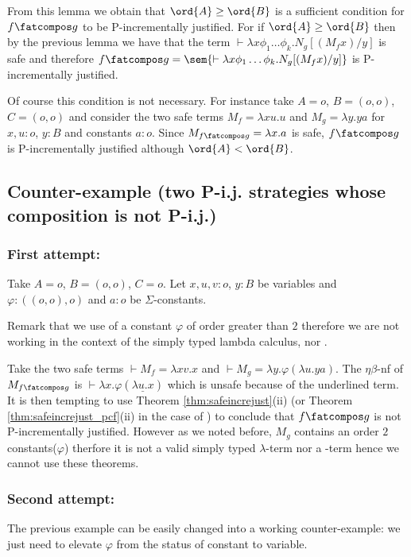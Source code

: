 From this lemma we obtain that $\ord{A}\geq\ord{B}$ is
a sufficient condition for $f\fatcompos g$ to be P-incrementally justified.
For if $\ord{A}\geq\ord{B}$ then by the previous lemma we have that the term $\vdash \lambda x \phi_1 \dots \phi_k. N_g [(M_f x) / y]$
is safe and therefore $f\fatcompos g = \sem{\vdash \lambda x \phi_1 \dots \phi_k. N_g [(M_f x) / y]}$ is P-incrementally justified.


Of course this condition is not necessary. For instance take $A=o$, $B=(o,o)$, $C=(o,o)$ and consider the two safe terms $M_f = \lambda x u.u$ and $M_g = \lambda y . y a$ for $x,u:o$, $y:B$ and constants $a:o$. Since $M_{f\fatcompos g} = \lambda x . a$ is safe, $f\fatcompos g$ is P-incrementally justified although $\ord{A} < \ord{B}$.





\subsection{Counter-example (two P-i.j. strategies whose composition is not P-i.j.)}
\subsubsection{First attempt:}

Take $A=o$, $B=(o,o)$, $C=o$. Let $x,u,v:o$, $y:B$ be variables and $\varphi:((o,o),o)$ and $a:o$ be $\Sigma$-constants.

Remark that we use of a constant $\varphi$ of order greater than $2$ therefore we are not working in the context of the simply typed lambda calculus, nor \pcf.

Take the two safe terms $\vdash  M_f = \lambda xv.x$ and $\vdash M_g = \lambda y . \varphi (\lambda u . y a)$.
The $\eta\beta$-nf of $M_{f\fatcompos g}$ is $\vdash \lambda x . \varphi (\underline{\lambda u . x})$ which is unsafe because of the underlined term. It is then tempting to use
Theorem \ref{thm:safeincrejust}(ii) (or Theorem \ref{thm:safeincrejust_pcf}(ii) in the case of \pcf) to conclude that
$f\fatcompos g$ is not P-incrementally justified. However as we noted before, $M_g$ contains an order $2$ constants($\varphi$) therfore it is not a valid simply typed $\lambda$-term nor a \pcf-term hence we cannot use these theorems.

\subsubsection{Second attempt:}
The previous example can be easily changed into a working counter-example: we just need to elevate $\varphi$ from the status of constant to variable.

